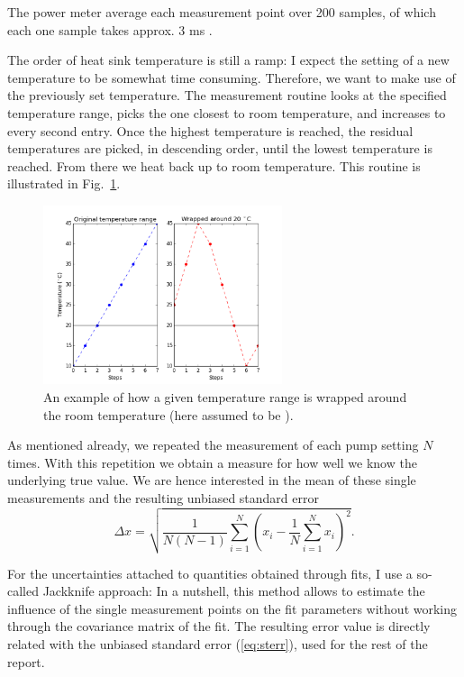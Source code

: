 The power meter average each measurement point
over 200 samples,
of which each one sample
takes approx. 3 ms \cite{ThorlabsPM}.

The order of heat sink temperature
is still a ramp:
I expect the setting of a new temperature to be somewhat time consuming.
Therefore, we want to make use of the previously set temperature.
The measurement routine looks at the specified temperature range,
picks the one closest to room temperature,
and increases to every second entry.
Once the highest temperature is reached,
the residual temperatures are picked,
in descending order, until the lowest temperature is reached.
From there we heat back up to room temperature.
This routine is illustrated in Fig.~\ref{img:temproutine}.

\begin{figure}
\centering
\includegraphics[width=7cm]{img/temp_wrap.png}
\caption{An example of how a given temperature range is wrapped around the room temperature
(here assumed to be ).}
\label{img:temproutine}
\end{figure}

As mentioned already,
we repeated the measurement of each pump setting
$N$ times.
With this repetition we obtain a measure
for how well we know
the underlying true value.
We are hence interested in
the mean of these single measurements and
the resulting unbiased standard error \cite{Barlow}
\begin{equation}
\Delta x = \sqrt{ \frac{1}{N(N-1)}
	\sum\limits_{i=1}^N (x_i - 
		\frac{1}{N} \sum\limits_{i=1}^N x_i )^2 }.
\label{eq:sterr}
\end{equation}

For the uncertainties attached to
quantities obtained through fits,
I use a so-called
Jackknife \cite{Efron1983} approach:
In a nutshell,
this method allows to estimate
the influence of the single measurement points
on the fit parameters
without working through
the covariance matrix of the fit.
The resulting error value
is directly related with the
unbiased standard error (\ref{eq:sterr}),
used for the rest of the report.

